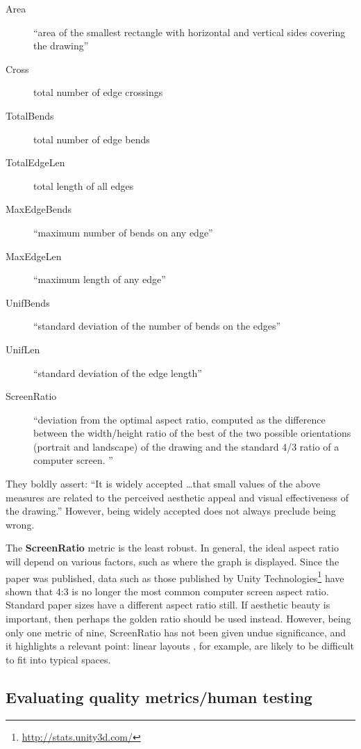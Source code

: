 \begin{description}
    \item[Area]
``area of the smallest rectangle with horizontal and vertical sides covering the drawing''
    \item[Cross]
total number of edge crossings
    \item[TotalBends]
total number of edge bends
    \item[TotalEdgeLen]
total length of all edges
    \item[MaxEdgeBends]
``maximum number of bends on any edge''
    \item[MaxEdgeLen]
``maximum length of any edge''
    \item[UnifBends]
``standard deviation of the number of bends on the edges''
    \item[UnifLen]
``standard deviation of the edge length''
    \item[ScreenRatio]
``deviation from the optimal aspect ratio, computed as the difference between the width/height ratio of the best of the two possible orientations (portrait and landscape) of the drawing and the standard 4/3 ratio of a computer screen. ''
\end{description}

They boldly assert: ``It is widely accepted \ldots that small values of the above measures are related to the perceived aesthetic appeal and visual effectiveness of the drawing.''
However, being widely accepted does not always preclude being wrong.

The \textbf{ScreenRatio} metric is the least robust.
In general, the ideal aspect ratio will depend on various factors, such as where the graph is displayed.
Since the paper was published, data such as those published by Unity Technologies\footnote{\url{http://stats.unity3d.com/}} have shown that 4:3 is no longer the most common computer screen aspect ratio.
Standard paper sizes have a different aspect ratio still.
If aesthetic beauty is important, then perhaps the golden ratio  should be used instead.
However, being only one metric of nine, ScreenRatio has not been given undue significance, and it highlights a relevant point: linear layouts , for example, are likely to be difficult to fit into typical spaces.


\subsection{Evaluating quality metrics/human testing}

